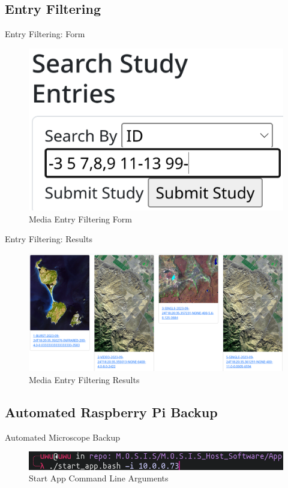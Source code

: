 \documentclass[17pt, aspectratio=169]{beamer}
\begin{document}
\subsection{Entry Filtering}
\begin{frame}{Entry Filtering: Form}
	\begin{figure}
		\includegraphics[height=0.55\textheight]{./Figures/entry_filtering_form.png}
		\caption{Media Entry Filtering Form}
	\end{figure}

\end{frame}
\begin{frame}{Entry Filtering: Results}
	\begin{figure}
		\includegraphics[height=0.55\textheight]{./Figures/entry_filtering_results.png}
		\caption{Media Entry Filtering Results}
	\end{figure}

\end{frame}
\subsection*{Automated Raspberry Pi Backup}
\begin{frame}{Automated Microscope Backup}
	\begin{figure}
		\includegraphics[width=\textwidth]{./Figures/automated_media_backup.png}
		\caption{Start App Command Line Arguments}
	\end{figure}
\end{frame}
\end{document}
